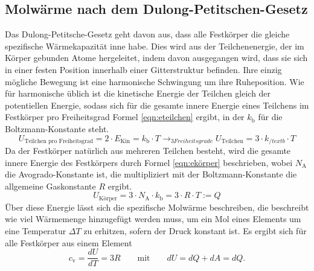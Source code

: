 \documentclass[titlepage = firstcover]{scrartcl}
\begin{document}
        \subsection{Molwärme nach dem Dulong-Petitschen-Gesetz}
            Das Dulong-Petitsche-Gesetz geht davon aus, dass alle Festkörper die gleiche spezifische Wärmekapazität inne habe. Dies wird aus der
            Teilchenenergie, der im Körper gebunden Atome hergeleitet, indem davon ausgegangen wird, dass sie sich in einer festen Position
            innerhalb einer Gitterstruktur befinden. Ihre einzig mögliche Bewegung ist eine harmonische Schwingung um ihre Ruheposition. Wie für
            harmonische üblich ist die kinetische Energie der Teilchen gleich der potentiellen Energie, sodass sich für die gesamte innere Energie eines 
            Teilchens im Festkörper pro Freiheitsgrad Formel \eqref{eqn:eteilchen} ergibt, in der $k_{\text{b}}$ für die Boltzmann-Konstante steht.
            \begin{equation}
                U_{\text{Teilchen pro Freiheitsgrad}} = 2 \cdot E_{\text{Kin}} = k_{\text{b}} \cdot T \longrightarrow_{3 Freiheitsgrade} U_{\text{Teilchen}} = 3 \cdot k_{/text{b}} \cdot T
                \label{eqn:eteilchen}
            \end{equation} 
            Da der Festkörper natürlich aus mehreren Teilchen besteht, wird die gesamte innere Energie des Festkörpers durch Formel \eqref{eqn:ekörper} beschrieben, 
            wobei $N_{\text{A}}$ die Avogrado-Konstante ist, die multipliziert mit der Boltzmann-Konstante die allgemeine Gaskonstante $R$ ergibt. 
            \begin{equation}
                U_{\text{Körper}} = 3 \cdot N_{\text{A}} \cdot k_{\text{b}} = 3 \cdot R \cdot T := Q
                \label{eqn:ekörper}
            \end{equation}
            Über diese Energie lässt sich die spezifische Molwärme beschreiben, die beschreibt wie viel Wärmemenge hinzugefügt werden muss, um ein Mol eines
            Elements um eine Temperatur $\Delta T$ zu erhitzen, sofern der Druck konstant ist. Es ergibt sich für alle Festkörper aus einem Element
            \begin{equation}
                c_{\text{v}} = \frac{dU}{dT} = 3R \qquad \text{mit} \qquad dU = dQ + dA = dQ .
            \end{equation}
            
    \newpage
\end{document}
